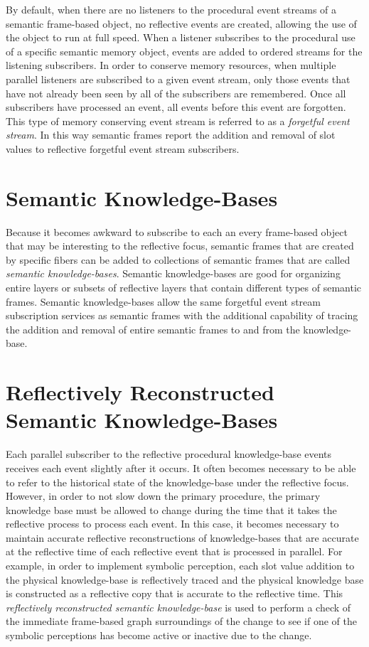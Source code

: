 By default, when there are no listeners to the procedural event
streams of a semantic frame-based object, no reflective events are
created, allowing the use of the object to run at full speed.  When a
listener subscribes to the procedural use of a specific semantic
memory object, events are added to ordered streams for the listening
subscribers.  In order to conserve memory resources, when multiple
parallel listeners are subscribed to a given event stream, only those
events that have not already been seen by all of the subscribers are
remembered.  Once all subscribers have processed an event, all events
before this event are forgotten.  This type of memory conserving event
stream is referred to as a \emph{forgetful event stream}.  In this way
semantic frames report the addition and removal of slot values to
reflective forgetful event stream subscribers.

\section{Semantic Knowledge-Bases}

Because it becomes awkward to subscribe to each an every frame-based
object that may be interesting to the reflective focus, semantic
frames that are created by specific fibers can be added to collections
of semantic frames that are called \emph{semantic knowledge-bases}.
Semantic knowledge-bases are good for organizing entire layers or
subsets of reflective layers that contain different types of semantic
frames.  Semantic knowledge-bases allow the same forgetful event
stream subscription services as semantic frames with the additional
capability of tracing the addition and removal of entire semantic
frames to and from the knowledge-base.

\section{Reflectively Reconstructed Semantic Knowledge-Bases}

Each parallel subscriber to the reflective procedural knowledge-base
events receives each event slightly after it occurs.  It often becomes
necessary to be able to refer to the historical state of the
knowledge-base under the reflective focus.  However, in order to not
slow down the primary procedure, the primary knowledge base must be
allowed to change during the time that it takes the reflective process
to process each event.  In this case, it becomes necessary to maintain
accurate reflective reconstructions of knowledge-bases that are
accurate at the reflective time of each reflective event that is
processed in parallel.  For example, in order to implement symbolic
perception, each slot value addition to the physical knowledge-base is
reflectively traced and the physical knowledge base is constructed as
a reflective copy that is accurate to the reflective time.  This
\emph{reflectively reconstructed semantic knowledge-base} is used to
perform a check of the immediate frame-based graph surroundings of the
change to see if one of the symbolic perceptions has become active or
inactive due to the change.

